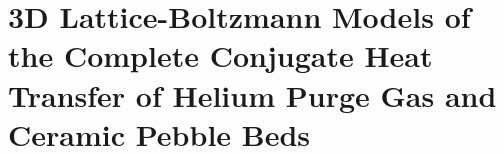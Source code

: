 \chapter{3D Lattice-Boltzmann Models of the Complete Conjugate Heat Transfer of Helium Purge Gas and Ceramic Pebble Beds}\label{sec:lbm-studies}